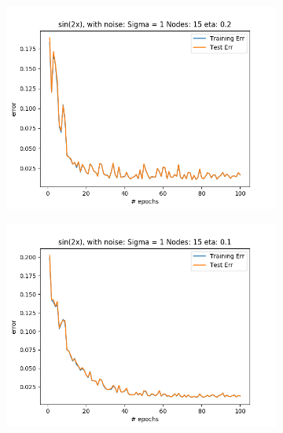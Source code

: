 \documentclass{article}
\begin{document}
\begin{figure}[ht!]
    \centering
    \begin{subfigure}[t]{0.4\textwidth}
        \centering
        \includegraphics[width=1\textwidth]{plots/noise/seq_sin2x_15nodes_sigma1_error_per_epoch.png}
        \caption{}
    \end{subfigure}
    \begin{subfigure}[t]{0.4\textwidth}
        \centering
        \includegraphics[width=1\textwidth]{plots/noise/seq_sin2x_15nodes_sigma1_error_per_epoch_eta01.png}
        \caption{}
    \end{subfigure}
    \begin{subfigure}[t]{0.4\textwidth}

\end{subfigure}
\end{figure}
\end{document}
